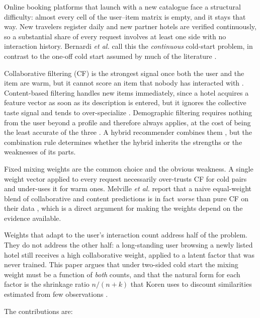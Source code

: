 \documentclass[conference]{IEEEtran}
\begin{document}

Online booking platforms that launch with a new catalogue face a
structural difficulty: almost every cell of the user--item matrix is
empty, and it stays that way. New travelers register daily and new
partner hotels are verified continuously, so a substantial share of
every request involves at least one side with no interaction
history. Bernardi \textit{et al.} call this the \emph{continuous}
cold-start problem, in contrast to the one-off cold start assumed by
much of the literature \cite{bernardi2015}.

Collaborative filtering (CF) is the strongest signal once both the
user and the item are warm, but it cannot score an item that nobody
has interacted with \cite{schein2002}. Content-based filtering
handles new items immediately, since a hotel acquires a feature
vector as soon as its description is entered, but it ignores the
collective taste signal and tends to over-specialize
\cite{lops2011}. Demographic filtering requires nothing from the
user beyond a profile and therefore always applies, at the cost of
being the least accurate of the three \cite{pazzani1999}. A hybrid
recommender combines them \cite{burke2002}, but the combination rule
determines whether the hybrid inherits the strengths or the
weaknesses of its parts.

Fixed mixing weights are the common choice and the obvious weakness.
A single weight vector applied to every request necessarily
over-trusts CF for cold pairs and under-uses it for warm ones.
Melville \textit{et al.} report that a naive equal-weight blend of
collaborative and content predictions is in fact \emph{worse} than
pure CF on their data \cite{melville2002}, which is a direct argument
for making the weights depend on the evidence available.

Weights that adapt to the user's interaction count address half of
the problem. They do not address the other half: a long-standing
user browsing a newly listed hotel still receives a high
collaborative weight, applied to a latent factor that was never
trained. This paper argues that under two-sided cold start the
mixing weight must be a function of \emph{both} counts, and that the
natural form for each factor is the shrinkage ratio $n/(n+k)$ that
Koren uses to discount similarities estimated from few observations
\cite{koren2008}.

The contributions are:
\end{document}
